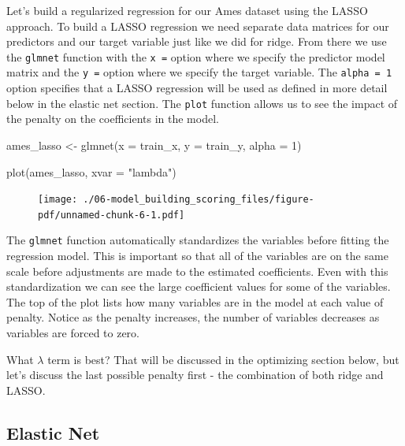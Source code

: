 \documentclass[
  letterpaper,
  DIV=11,
  numbers=noendperiod]{scrreprt}
\newenvironment{Shaded}{\begin{snugshade}}{\end{snugshade}}
\newcommand{\AttributeTok}[1]{\textcolor[rgb]{0.40,0.45,0.13}{#1}}
\newcommand{\DecValTok}[1]{\textcolor[rgb]{0.68,0.00,0.00}{#1}}
\newcommand{\FunctionTok}[1]{\textcolor[rgb]{0.28,0.35,0.67}{#1}}
\newcommand{\NormalTok}[1]{\textcolor[rgb]{0.00,0.23,0.31}{#1}}
\newcommand{\OtherTok}[1]{\textcolor[rgb]{0.00,0.23,0.31}{#1}}
\newcommand{\StringTok}[1]{\textcolor[rgb]{0.13,0.47,0.30}{#1}}
\begin{document}
Let's build a regularized regression for our Ames dataset using the
LASSO approach. To build a LASSO regression we need separate data
matrices for our predictors and our target variable just like we did for
ridge. From there we use the \texttt{glmnet} function with the
\texttt{x\ =} option where we specify the predictor model matrix and the
\texttt{y\ =} option where we specify the target variable. The
\texttt{alpha\ =\ 1} option specifies that a LASSO regression will be
used as defined in more detail below in the elastic net section. The
\texttt{plot} function allows us to see the impact of the penalty on the
coefficients in the model.

\begin{Shaded}
\begin{Highlighting}[]
\NormalTok{ames\_lasso }\OtherTok{\textless{}{-}} \FunctionTok{glmnet}\NormalTok{(}\AttributeTok{x =}\NormalTok{ train\_x,  }\AttributeTok{y =}\NormalTok{ train\_y,  }\AttributeTok{alpha =} \DecValTok{1}\NormalTok{)}

\FunctionTok{plot}\NormalTok{(ames\_lasso, }\AttributeTok{xvar =} \StringTok{"lambda"}\NormalTok{)}
\end{Highlighting}
\end{Shaded}

\begin{figure}[H]

{\centering \texttt{[image: ./06-model\_building\_scoring\_files/figure-pdf/unnamed-chunk-6-1.pdf]}

}

\end{figure}

The \texttt{glmnet} function automatically standardizes the variables
before fitting the regression model. This is important so that all of
the variables are on the same scale before adjustments are made to the
estimated coefficients. Even with this standardization we can see the
large coefficient values for some of the variables. The top of the plot
lists how many variables are in the model at each value of penalty.
Notice as the penalty increases, the number of variables decreases as
variables are forced to zero.

What \(\lambda\) term is best? That will be discussed in the optimizing
section below, but let's discuss the last possible penalty first - the
combination of both ridge and LASSO.

\hypertarget{elastic-net}{%
\subsection{Elastic Net}\label{elastic-net}}
\end{document}
